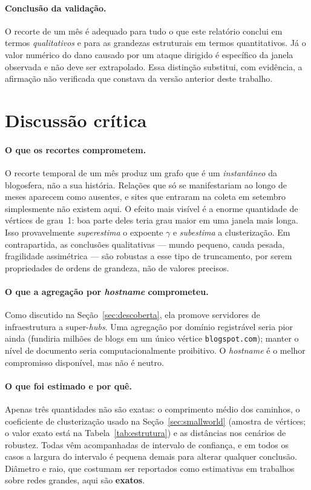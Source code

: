 \documentclass[sigconf]{webmedia}
\begin{document}
\paragraph{Conclusão da validação.} O recorte de um mês é adequado para
tudo o que este relatório conclui em termos \emph{qualitativos} e para
as grandezas estruturais em termos quantitativos. Já o valor numérico do
dano causado por um ataque dirigido é específico da janela observada e
não deve ser extrapolado. Essa distinção substitui, com evidência, a
afirmação não verificada que constava da versão anterior deste trabalho.

\section{Discussão crítica}
\label{sec:discussao}

\paragraph{O que os recortes comprometem.} O recorte temporal de um mês
produz um grafo que é um \emph{instantâneo} da blogosfera, não a sua
história. Relações que só se manifestariam ao longo de meses aparecem como
ausentes, e sites que entraram na coleta em setembro simplesmente não
existem aqui. O efeito mais visível é a enorme quantidade de vértices de
grau~1: boa parte deles teria grau maior em uma janela mais longa. Isso
provavelmente \emph{superestima} o expoente $\gamma$ e \emph{subestima} a
clusterização. Em contrapartida, as conclusões qualitativas --- mundo
pequeno, cauda pesada, fragilidade assimétrica --- são robustas a esse
tipo de truncamento, por serem propriedades de ordens de grandeza, não de
valores precisos.

\paragraph{O que a agregação por \textit{hostname} comprometeu.} Como
discutido na Seção~\ref{sec:descoberta}, ela promove servidores de
infraestrutura a super-\textit{hubs}. Uma agregação por domínio
registrável seria pior ainda (fundiria milhões de blogs em um único
vértice \texttt{blogspot.com}); manter o nível de documento seria
computacionalmente proibitivo. O \textit{hostname} é o melhor compromisso
disponível, mas não é neutro.

\paragraph{O que foi estimado e por quê.} Apenas três quantidades não são
exatas: o comprimento médio dos caminhos, o coeficiente de clusterização
usado na Seção~\ref{sec:smallworld} (amostra de \swAmostraC{} vértices; o
valor exato está na Tabela~\ref{tab:estrutura}) e as distâncias nos
cenários de robustez. Todas vêm acompanhadas de intervalo de confiança, e
em todos os casos a largura do intervalo é pequena demais para alterar
qualquer conclusão. Diâmetro e raio, que costumam ser reportados como
estimativas em trabalhos sobre redes grandes, aqui são \textbf{exatos}.
\end{document}
